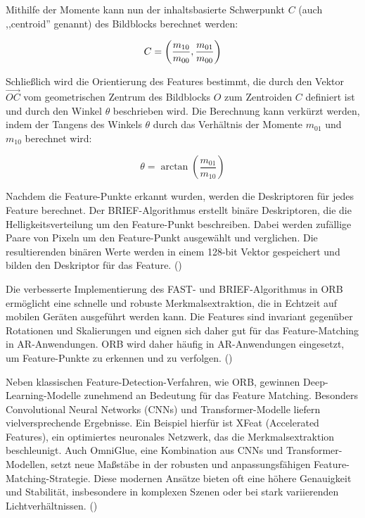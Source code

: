 Mithilfe der Momente kann nun der inhaltsbasierte Schwerpunkt \( C \) (auch ,,centroid'' genannt) des Bildblocks berechnet werden:

\begin{equation}
C = 
\left(
\frac{m_{10}}{m_{00}}, \\
\frac{m_{01}}{m_{00}}
\right)
\end{equation}

Schließlich wird die Orientierung des Features bestimmt, die durch den Vektor \( \overrightarrow{OC} \) vom geometrischen Zentrum des Bildblocks \( O \) zum Zentroiden \( C \) definiert ist und durch den Winkel \( \theta \) beschrieben wird. Die Berechnung kann verkürzt werden, indem der Tangens des Winkels \( \theta \) durch das Verhältnis der Momente \( m_{01} \) und \( m_{10} \) berechnet wird:

\begin{equation}
    \theta = \arctan \left( \frac{m_{01}}{m_{10}} \right)
\end{equation}

Nachdem die Feature-Punkte erkannt wurden, werden die Deskriptoren für jedes Feature berechnet. Der BRIEF-Algorithmus erstellt binäre Deskriptoren, die die Helligkeitsverteilung um den Feature-Punkt beschreiben. Dabei werden zufällige Paare von Pixeln um den Feature-Punkt ausgewählt und verglichen. Die resultierenden binären Werte werden in einem 128-bit Vektor gespeichert und bilden den Deskriptor für das Feature. (\cite{gao2021vSLAM, calonder2010brief})

Die verbesserte Implementierung des FAST- und BRIEF-Algorithmus in ORB ermöglicht eine schnelle und robuste Merkmalsextraktion, die in Echtzeit auf mobilen Geräten ausgeführt werden kann. Die Features sind invariant gegenüber Rotationen und Skalierungen und eignen sich daher gut für das Feature-Matching in AR-Anwendungen. ORB wird daher häufig in AR-Anwendungen eingesetzt, um Feature-Punkte zu erkennen und zu verfolgen. (\cite{gao2021vSLAM, rublee2011orb})

Neben klassischen Feature-Detection-Verfahren, wie ORB, gewinnen Deep-Learning-Modelle zunehmend an Bedeutung für das Feature Matching. Besonders Convolutional Neural Networks (CNNs) und Transformer-Modelle liefern vielversprechende Ergebnisse. Ein Beispiel hierfür ist XFeat (Accelerated Features), ein optimiertes neuronales Netzwerk, das die Merkmalsextraktion beschleunigt. Auch OmniGlue, eine Kombination aus CNNs und Transformer-Modellen, setzt neue Maßstäbe in der robusten und anpassungsfähigen Feature-Matching-Strategie. Diese modernen Ansätze bieten oft eine höhere Genauigkeit und Stabilität, insbesondere in komplexen Szenen oder bei stark variierenden Lichtverhältnissen. (\cite{ghosh2024fmNN})

